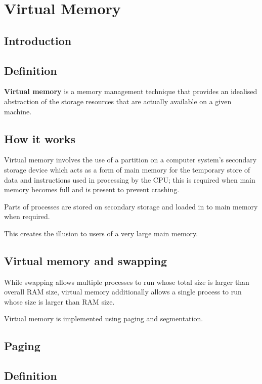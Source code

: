 \documentclass[a4paper]{systems-software}
\begin{document}
\chapter{Virtual Memory}

\section{Introduction}

\section*{Definition}

\textbf{Virtual memory} is a memory management technique that provides an idealised abstraction of the storage resources that are actually available on a given machine.


\section*{How it works}

Virtual memory involves the use of a partition on a computer system’s secondary storage device which acts as a form of main memory for the temporary store of data and instructions used in processing by the CPU; this is required when main memory becomes full and is present to prevent crashing.

Parts of processes are stored on secondary storage and loaded in to main memory when required.

This creates the illusion to users of a very large main memory.


\section*{Virtual memory and swapping}

While swapping allows multiple processes to run whose total size is larger than overall RAM size, virtual memory additionally allows a single process to run whose size is larger than RAM size.

Virtual memory is implemented using paging and segmentation.


\section{Paging}

\section*{Definition}
\end{document}
